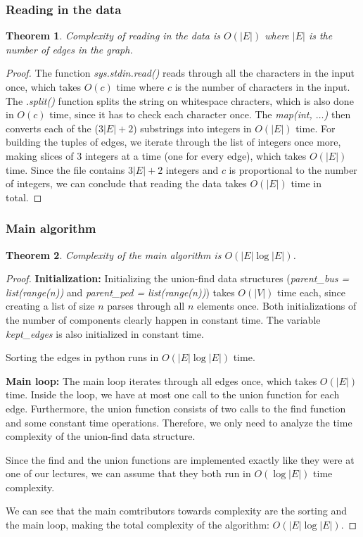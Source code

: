 \documentclass[a4paper]{article}
\newtheorem{theorem}{Theorem}
\begin{document}
\subsubsection*{Reading in the data}

\begin{theorem}
    Complexity of reading in the data is $O(|E|)$ where $|E|$ is the number of edges in the graph.
\end{theorem}
\begin{proof}
    The function \textsl{sys.stdin.read()} reads through all the characters in the input once, which takes $O(c)$ time where $c$ is the number of characters in the input. The \textsl{.split()} function splits the string on whitespace chracters, which is also done in $O(c)$ time, since it has to check each character once. The \textsl{map(int, $\ldots$)} then converts each of the ($3|E| + 2$) substrings into integers in $O(|E|)$ time. For building the tuples of edges, we iterate through the list of integers once more, making slices of 3 integers at a time (one for every edge), which takes $O(|E|)$ time. Since the file contains $3|E| + 2$ integers and $c$ is proportional to the number of integers, we can conclude that reading the data takes $O(|E|)$ time in total.
\end{proof}

\subsubsection*{Main algorithm}
\begin{theorem}
    Complexity of the main algorithm is $O(|E| \log |E|)$.
\end{theorem}
\begin{proof}
    \textbf{Initialization:} Initializing the union-find data structures (\textsl{parent\_bus = list(range(n))} and \textsl{parent\_ped = list(range(n))}) takes $O(|V|)$ time each, since creating a list of size $n$ parses through all $n$ elements once. Both initializations of the number of components clearly happen in constant time. The variable \textsl{kept\_edges} is also initialized in constant time.

    Sorting the edges in python runs in $O(|E| \log |E|)$ time.

    \textbf{Main loop:} The main loop iterates through all edges once, which takes $O(|E|)$ time. Inside the loop, we have at most one call to the union function for each edge. Furthermore, the union function consists of two calls to the find function and some constant time operations. Therefore, we only need to analyze the time complexity of the union-find data structure.

    Since the find and the union functions are implemented exactly like they were at one of our lectures, we can assume that they both run in $O(\log|E|)$ time complexity.
    
    We can see that the main comtributors towards complexity are the sorting and the main loop, making the total complexity of the algorithm: $O(|E| \log |E|)$.
\end{proof}
\end{document}
